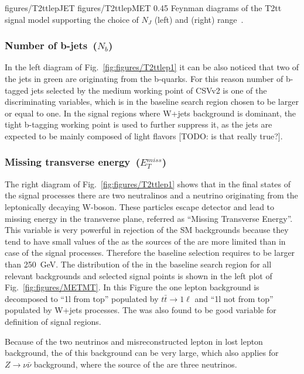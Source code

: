                  {figures/T2ttlepJET} %
                 {figures/T2ttlepMET} %
                 {0.45}       %
                 { Feynman diagrams of the T2tt signal model supporting the choice of $N_{J}$ (left) and \MET (right) range~\cite{CMS:2016vew}. }

\subsubsection{Number of b-jets~($N_{b}$)}

In the left diagram of Fig.~\ref{fig:figures/T2ttlep1} it can be also noticed that two of the jets in green are originating from the b-quarks. For this reason number of b-tagged jets selected by the medium working point of CSVv2 is one of the discriminating variables, which is in the baseline search region  chosen to be larger or equal to one. In the signal regions where W+jets background is dominant, the tight b-tagging working point is used to further suppress it, as the jets are expected to be mainly composed of light flavors [TODO: is that really true?].

\subsubsection{Missing transverse energy~($E_{T}^{miss}$)}

The right diagram of Fig.~\ref{fig:figures/T2ttlep1} shows that in the final states of the signal processes there are two neutralinos and a neutrino originating from the leptonically decaying W-boson. These particles escape detector and lead to missing energy in the transverse plane, referred as ``Missing Transverse Energy''. This variable is very powerful in rejection of the SM backgrounds because they tend to have small values of the \MET as the sources of the \MET are more limited than in case of the signal processes. Therefore the baseline selection requires \MET to be larger than 250~GeV. The distribution of the \MET in the baseline search region for all relevant backgrounds and selected signal points is shown in the left plot of Fig.~\ref{fig:figures/METMT}. In this Figure the one lepton background is decomposed to ``1l from top'' populated by $t \bar{t} \to 1\ell$ and ``1l not from top'' populated by W+jets processes. The \MET was also found to be good variable for definition of signal regions.

Because of the two neutrinos and misreconstructed lepton in lost lepton background, the \MET of this background can be very large, which also applies for $Z \to \nu \bar{\nu}$ background, where the source of the \MET are three neutrinos.

